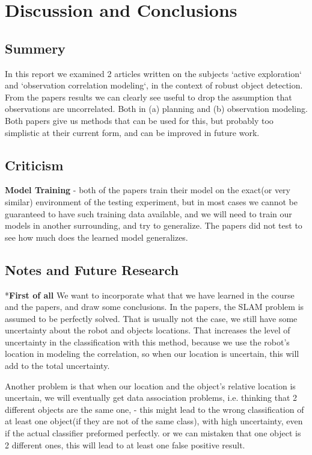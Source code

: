 \documentclass{article}
\begin{document}
	
	\section{Discussion and Conclusions}
	
	\subsection{Summery}
	In this report we examined 2 articles written on the subjects `active exploration` and `observation correlation modeling`,
	in the context of robust object detection. From the papers results we can clearly see useful to drop the assumption that observations are uncorrelated.
	Both in (a) planning and (b) observation modeling. Both papers give us methods that can be used for this, but probably too simplistic at their current form, and can be improved in future work.
	
	
	\subsection{Criticism}
	\textbf{Model Training} - both of the papers train their model on the exact(or very similar) environment of the testing experiment, but in most cases we cannot be guaranteed to have such training data available, and we will need to train our models in another surrounding, and try to generalize. The papers did not test to see how much does the learned model generalizes.  
	
	\subsection{Notes and Future Research}
	
	*\textbf{First of all} We want to incorporate what that we have learned in the course and the papers, and draw some conclusions.
	In the papers, the SLAM problem is assumed to be perfectly solved. That is usually not the case, we still have some uncertainty about the robot and objects locations. That increases the level of uncertainty in the classification with this method, because we use the robot's location in modeling the correlation, so when our location is uncertain, this will add to the total uncertainty.
	
	Another problem is that when our location and the object's relative location is uncertain, we will eventually get data association problems, i.e. thinking that 2 different objects are the same one, - this might lead to the wrong classification of at least one object(if they are not of the same class), with high uncertainty, even if the actual classifier preformed perfectly.
	or we can mistaken that one object is 2 different ones, this will lead to at least one false positive result.
	
\end{document}

